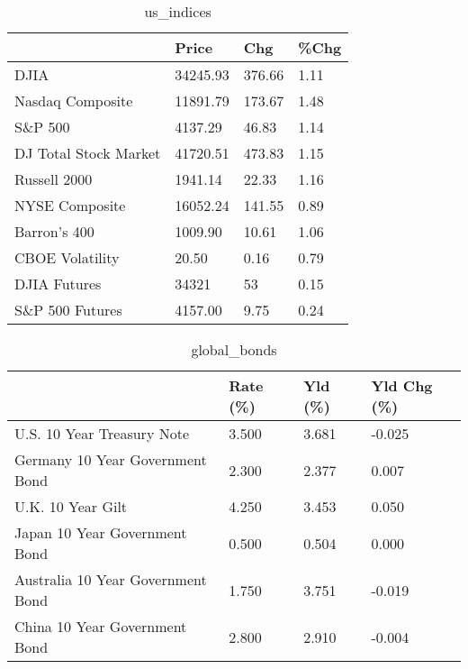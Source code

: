 \documentclass{article}%
\begin{document}
%


\begin{table}[htbp]%
\caption{us\_indices}%
\centering%
\begin{adjustbox}{width=1\textwidth}%
\begin{tabular}{llll}
\toprule
                      &    Price &    Chg & \%Chg \\
\midrule
                 DJIA & 34245.93 & 376.66 & 1.11 \\
     Nasdaq Composite & 11891.79 & 173.67 & 1.48 \\
              S\&P 500 &  4137.29 &  46.83 & 1.14 \\
DJ Total Stock Market & 41720.51 & 473.83 & 1.15 \\
         Russell 2000 &  1941.14 &  22.33 & 1.16 \\
       NYSE Composite & 16052.24 & 141.55 & 0.89 \\
         Barron's 400 &  1009.90 &  10.61 & 1.06 \\
      CBOE Volatility &    20.50 &   0.16 & 0.79 \\
         DJIA Futures &    34321 &     53 & 0.15 \\
      S\&P 500 Futures &  4157.00 &   9.75 & 0.24 \\
\bottomrule
\end{tabular}
%
\end{adjustbox}%
\end{table}

%


\begin{table}[htbp]%
\caption{global\_bonds}%
\centering%
\begin{adjustbox}{width=1\textwidth}%
\begin{tabular}{llll}
\toprule
                                  & Rate (\%) & Yld (\%) & Yld Chg (\%) \\
\midrule
       U.S. 10 Year Treasury Note &    3.500 &   3.681 &      -0.025 \\
  Germany 10 Year Government Bond &    2.300 &   2.377 &       0.007 \\
                U.K. 10 Year Gilt &    4.250 &   3.453 &       0.050 \\
    Japan 10 Year Government Bond &    0.500 &   0.504 &       0.000 \\
Australia 10 Year Government Bond &    1.750 &   3.751 &      -0.019 \\
    China 10 Year Government Bond &    2.800 &   2.910 &      -0.004 \\
\bottomrule
\end{tabular}
%
\end{adjustbox}%
\end{table}
\end{document}

